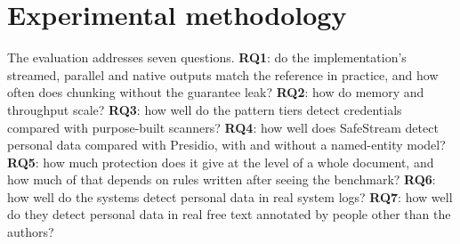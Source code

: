 \documentclass[pdflatex,sn-mathphys-num]{sn-jnl}
\theoremstyle{thmstyleone}
\theoremstyle{thmstylethree}
\begin{document}
\section{Experimental methodology}\label{sec:setup}

The evaluation addresses seven questions. \textbf{RQ1}: do the implementation's streamed, parallel and native outputs match the reference in practice, and how often does chunking without the guarantee leak? \textbf{RQ2}: how do memory and throughput scale? \textbf{RQ3}: how well do the pattern tiers detect credentials compared with purpose-built scanners? \textbf{RQ4}: how well does SafeStream detect personal data compared with Presidio, with and without a named-entity model? \textbf{RQ5}: how much protection does it give at the level of a whole document, and how much of that depends on rules written after seeing the benchmark? \textbf{RQ6}: how well do the systems detect personal data in real system logs? \textbf{RQ7}: how well do they detect personal data in real free text annotated by people other than the authors?
\end{document}
